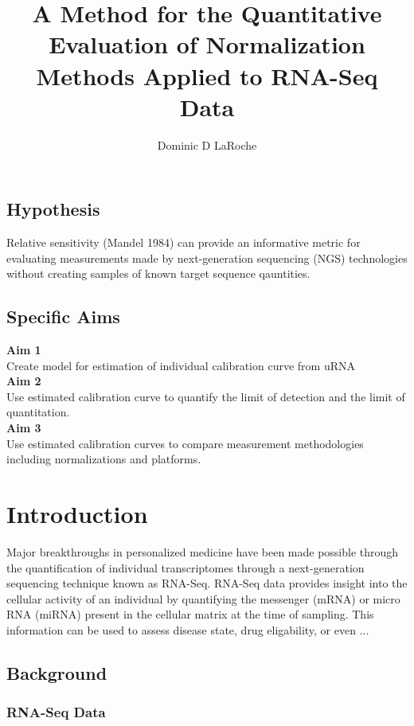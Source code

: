 \documentclass{book}\usepackage[]{graphicx}\usepackage[]{color}
\title{A Method for the Quantitative Evaluation of Normalization Methods Applied to RNA-Seq Data}
\author{Dominic D LaRoche}
\begin{document}
\maketitle
\tableofcontents

\newpage

\section{Hypothesis}
Relative sensitivity (Mandel 1984) can provide an informative metric for evaluating measurements made by next-generation sequencing (NGS) technologies without creating samples of known target sequence qauntities.  \\
\section{Specific Aims}

\textbf{Aim 1}\\
Create model for estimation of individual calibration curve from uRNA\\

\textbf{Aim 2}\\
Use estimated calibration curve to quantify the limit of detection and the limit of quantitation.\\

\textbf{Aim 3}\\
Use estimated calibration curves to compare measurement methodologies including normalizations and platforms.\\


\chapter{Introduction}

Major breakthroughs in personalized medicine have been made possible through the quantification of individual transcriptomes through a next-generation sequencing technique known as RNA-Seq.  RNA-Seq data provides insight into the cellular activity of an individual by quantifying the messenger (mRNA) or micro RNA (miRNA) present in the cellular matrix at the time of sampling.  This information can be used to assess disease state, drug eligability, or even ...




\section{Background}
\subsection{RNA-Seq Data}
\end{document}
